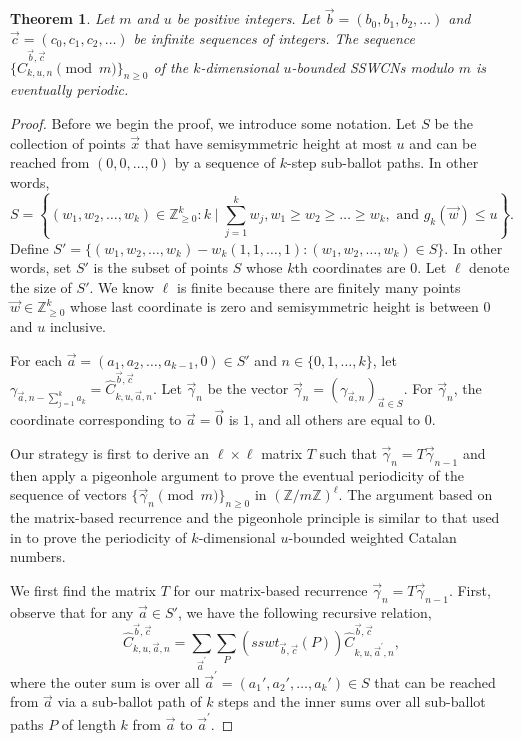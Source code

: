 \documentclass[11pt]{article}
\newtheorem{theorem}{Theorem}[section]
\theoremstyle{remark}
\theoremstyle{definition}
\begin{document}
\begin{theorem}
\label{thm:periodboundedkdim}
    Let $m$ and $u$ be positive integers. Let $\vec{b}= (b_0, b_1, b_2, \dots)$ and $\vec{c}= (c_0, c_1, c_2, \dots)$ be infinite sequences of integers. The sequence $\{\widehat{C}_{k,u,n}^{\vec{b},\vec{c}}\pmod{m} \}_{n\geq 0}$ of the $k$-dimensional $u$-bounded SSWCNs modulo $m$ is  eventually periodic.
\end{theorem}
\begin{proof}
Before we begin the proof, we introduce some notation. Let $S$ be the collection of points $\vec{x}$ that have semisymmetric height at most $u$ and can be reached from $(0, 0, \dots, 0)$ by a sequence of $k$-step sub-ballot paths. In other words, $$S  = \left\{(w_1, w_2, \dots, w_k) \in \mathbb{Z}_{\geq 0}^k :  k \mid \sum_{j=1}^kw_j, w_1 \geq w_2 \geq \dots \geq w_k, \mbox{ and } g_k(\vec{w})\leq u\right\}.$$ Define $S' = \{(w_1, w_2, \dots, w_k) - w_k(1, 1, \dots , 1):(w_1, w_2, \dots, w_k) \in S \}$. In other words, set $S'$ is the subset of points $S$ whose $k$th coordinates are $0$. Let $\ell$ denote the size of $S'$. We know $\ell$ is finite because there are finitely many points $\vec{w} \in \mathbb{Z}_{\geq 0}^k$ whose last coordinate is zero and semisymmetric height is between $0$ and $u$ inclusive. 

For each $\vec{a} = (a_1, a_2, \dots, a_{k-1}, 0) \in S'$ and $n \in \{0,1,\dots,k\}$, let $\gamma_{\vec{a}, n-\sum_{j=1}^k a_k} = \widehat{C}_{k, u, \vec{a}, n}^{\vec{b},\vec{c}}$. Let $\vec{\gamma}_n$ be the vector $\vec{\gamma}_n = (\gamma_{\vec{a}, n})_{\vec{a} \in S}$. For $\vec{\gamma}_n$, the coordinate corresponding to $\vec{a} = \vec{0}$ is $1$, and all others are equal to $0$.

Our strategy is first to derive an $\ell \times \ell$ matrix $T$ such that $\vec{\gamma}_n = T \vec{\gamma}_{n-1}$ and then apply a pigeonhole argument to prove the eventual periodicity of the sequence of vectors $\{\vec{\gamma}_n \pmod m\}_{n\ge 0}$ in $(\mathbb{Z}/m\mathbb{Z})^\ell$. The argument based on the matrix-based recurrence and the pigeonhole principle is similar to that used in \cite{MR5034574} to prove the periodicity of $k$-dimensional $u$-bounded weighted Catalan numbers.
    
We first find the matrix $T$ for our matrix-based recurrence $\vec{\gamma}_n = T\vec{\gamma}_{n-1}$. First, observe that for any $\vec{a} \in S'$, we have the following recursive relation, \begin{equation}\label{eq:Recursion}\widehat{C}_{k, u, \vec{a}, n}^{\vec{b}, \vec{c}} = \sum_{\vec{a}^{\prime}} \sum_{P} \left(sswt_{\vec{b}, \vec{c}}(P) \right)\widehat{C}_{k, u, \vec{a}^{\prime}, n}^{\vec{b}, \vec{c}},\end{equation} where the outer sum is over all $\vec{a}^{\prime}=(a_1', a_2',\dots, a_k') \in S$ that can be reached from $\vec{a}$ via a sub-ballot path of $k$ steps and the inner sums over all sub-ballot paths $P$ of length $k$ from $\vec{a}$ to $\vec{a}^{\prime}$. 


\end{proof}
\end{document}

